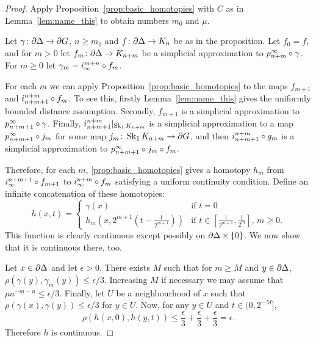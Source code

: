 \documentclass[a4paper]{article}
\begin{document}
\begin{proof}
  Apply Proposition~\ref{prop:basic_homotopies} with $C$ as in
  Lemma~\ref{lem:name_this} to obtain numbers $m_0$ and $\mu$.
  
  Let $\gamma\colon\partial\Delta\to\partial G$, $n\geq m_0$ and
  $f\colon\partial\Delta\to K_n$ be as in the proposition. Let $f_0 = f$,
  and for $m > 0$ let $f_m\colon\partial\Delta\to K_{n+m}$ be a
  simplicial approximation to $p^\infty_{n+m}\circ\gamma$. For $m \geq 0$
  let $\gamma_m = i^{m+n}_\infty\circ f_m$. 

  For each $m$ we can apply Proposition~\ref{prop:basic_homotopies} to the maps
  $f_{m+1}$ and $i^{n+m}_{n+m+1}\circ f_m$. To see this, firstly
  Lemma~\ref{lem:name_this} gives the uniformly bounded distance assumption.
  Secondly, $f_{m+1}$ is a simplicial approximation to
  $p^\infty_{n+m+1}\circ\gamma$. Finally,
  $i^{n+m}_{n+m+1}\vert_{\operatorname{Sk}_1 K_{n+m}}$ is a simplicial approximation
  to a map $p^\infty_{n+m+1}\circ j_m$ for some map $j_m\colon\operatorname{Sk}_1
  K_{n+m}\to \partial G$, and then $i^{n+m}_{n+m+1}\circ g_m$ is a
  simplicial approximation to $p^\infty_{n+m+1}\circ j_m\circ f_m$.
  
  Therefore, for each $m$, \cref{prop:basic_homotopies} gives a homotopy $h_m$
  from $i^{n+m+1}_\infty\circ f_{m+1}$ to $i^{n+m}_\infty \circ f_m$
  satisfying a uniform continuity condition. Define an infinite concatenation
  of these homotopies:
  \begin{equation*}
    h(x,t) = 
    \begin{cases}
      \gamma(x) & \text{if } t = 0\\
      h_m\left(x,2^{m+1}\left(t-\frac{1}{2^{m+1}}\right)\right) 
              & \text{if $t \in \left[\frac{1}{2^{m+1}}, \frac{1}{2^m}\right]$
                    , $m\geq 0$}.
    \end{cases}
  \end{equation*}
  This function is clearly continuous except possibly on
  $\partial\Delta\times\{0\}$. We now show that it is continuous there, too.

  Let $x \in \partial\Delta$ and let $\epsilon > 0$. There exists $M$ such
  that for $m \geq M$ and $y \in \partial \Delta$, $\rho(\gamma(y),
  \gamma_m(y)) \leq \epsilon/3$. Increasing $M$ if necessary we may assume that
  $\mu a^{-m-n} \leq \epsilon/3$.
  Finally, let $U$ be a neighbourhood of $x$ such that $\rho(\gamma(x),
  \gamma(y)) \leq \epsilon/3$ for $y \in U$. Now, for any $y \in U$ and 
  $t \in (0, 2^{-M}]$,
  \begin{equation*}
    \rho(h(x,0), h(y,t)) \leq \frac{\epsilon}{3} + \frac{\epsilon}{3} +
        \frac{\epsilon}{3} = \epsilon.
  \end{equation*}
  Therefore $h$ is continuous.


\end{proof}
\end{document}
